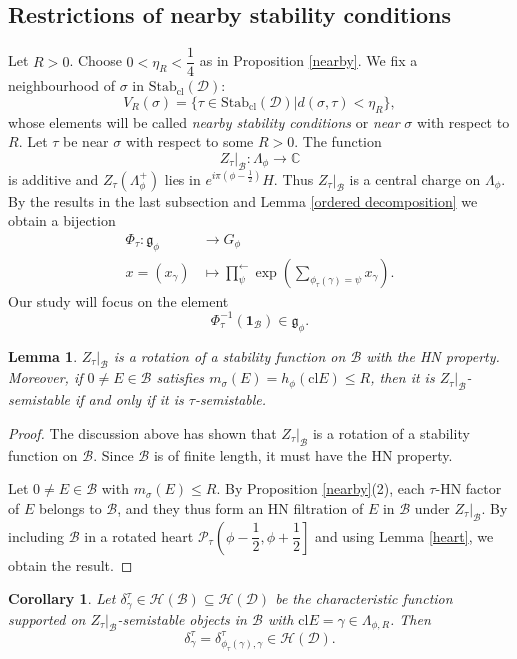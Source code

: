 \documentclass[a4paper,12pt]{amsart}
\numberwithin{equation}{section}
\newtheorem{lemma}[theorem]{Lemma}
\newtheorem{corollary}[theorem]{Corollary}
\newcommand{\Stab}{\mathrm{Stab}}
\newcommand{\cl}{\mathrm{cl}}
\newcommand{\1}{\mathbf{1}}
\begin{document}
\subsection{Restrictions of nearby stability conditions}
Let $R>0$. Choose $0<\eta_R<\dfrac{1}{4}$ as in Proposition \ref{nearby}. We fix a neighbourhood of $\sigma$ in $\Stab_\cl(\mathcal{D})$:
\[V_R(\sigma)=\{\tau\in\Stab_\cl(\mathcal{D})|d(\sigma,\tau)<\eta_R\},\]
whose elements will be called \emph{nearby stability conditions} or \emph{near} $\sigma$ with respect to $R$. Let $\tau$ be near $\sigma$ with respect to some $R>0$. The function
\[Z_\tau|_\mathcal{B}:\Lambda_\phi\rightarrow\mathbb{C}\]
is additive and $Z_\tau(\Lambda_\phi^+)$ lies in $e^{i\pi(\phi-\frac12)}H$. Thus $Z_\tau|_\mathcal{B}$ is a central charge on $\Lambda_\phi$. By the results in the last subsection and Lemma \ref{ordered decomposition} we obtain a bijection
\begin{align*}
    \Phi_\tau:\mathfrak{g}_\phi&\rightarrow G_\phi\\
    x=(x_\gamma)&\mapsto\prod_\psi^\leftarrow\exp\left(\sum_{\phi_\tau(\gamma)=\psi}x_\gamma\right).
\end{align*}
Our study will focus on the element
\[\Phi_\tau^{-1}(\1_{\mathcal{B}})\in\mathfrak{g}_\phi.\]
\begin{lemma}\label{semistable agree}
    $Z_\tau|_{\mathcal{B}}$ is a rotation of a stability function on $\mathcal{B}$ with the HN property. Moreover, if $0\neq E\in\mathcal{B}$ satisfies $m_\sigma(E)=h_\phi(\cl E)\leqslant R$, then it is $Z_\tau|_{\mathcal{B}}$-semistable if and only if it is $\tau$-semistable.
\end{lemma}
\begin{proof}
    The discussion above has shown that $Z_\tau|_{\mathcal{B}}$ is a rotation of a stability function on $\mathcal{B}$. Since $\mathcal{B}$ is of finite length, it must have the HN property.

    Let $0\neq E\in\mathcal{B}$ with $m_\sigma(E)\leqslant R$. By Proposition \ref{nearby}(2), each $\tau$-HN factor of $E$ belongs to $\mathcal{B}$, and they thus form an HN filtration of $E$ in $\mathcal{B}$ under $Z_\tau|_{\mathcal{B}}$. By including $\mathcal{B}$ in a rotated heart $\mathcal{P}_\tau\left(\phi-\dfrac12,\phi+\dfrac12\right]$ and using Lemma \ref{heart}, we obtain the result.
\end{proof}
\begin{corollary}\label{delta agree}
    Let $\delta^\tau_\gamma\in\mathcal{H}(\mathcal{B})\subseteq\mathcal{H}(\mathcal{D})$ be the characteristic function supported on $Z_\tau|_{\mathcal{B}}$-semistable objects in $\mathcal{B}$ with $\cl E=\gamma\in\Lambda_{\phi,R}$. Then
    \[\delta^\tau_\gamma=\delta^\tau_{\phi_\tau(\gamma),\gamma}\in\mathcal{H}(\mathcal{D}).\]
\end{corollary}
\end{document}
